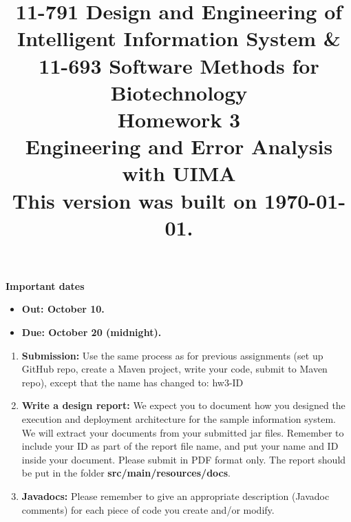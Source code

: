 \documentclass[oneside,11pt]{book}
\title{{\bfseries 11-791 Design and Engineering of Intelligent Information
System \& \\11-693 Software Methods for Biotechnology \\Homework 3}\\
\vspace{1em}
Engineering and Error Analysis with UIMA
\\
{\small This version was built on \today.}
}
\date{}
\begin{document}
\maketitle

\hspace{-0.1\textwidth}
\begin{minipage}{1.2\textwidth}
\vspace{-5em}
\textbf{Important dates}
\begin{itemize}

\item \textbf{Out: October 10.} 

\item \textbf{Due: October 20 (midnight).} 

\end{itemize}

\end{minipage}

\begin{enumerate}

\item \textbf{Submission:} 
Use the same process as for previous assignments (set up GitHub repo, create a Maven 
project, write your code, submit to Maven repo), except that the name has changed to:
hw3-ID

\item \textbf{Write a design report:}
We expect you to document how you designed the execution and
deployment architecture for the sample information system. 
We will extract your documents from your
submitted jar files. 
Remember to include your ID as part of the report file name, and put your name and
ID inside your document. Please submit in PDF format only.
The report should be put in the folder \textbf{src/main/resources/docs}.


\item \textbf{Javadocs:} 
Please remember to give an appropriate description (Javadoc comments) for each 
piece of code you create and/or modify.

\end{enumerate}
\end{document}
